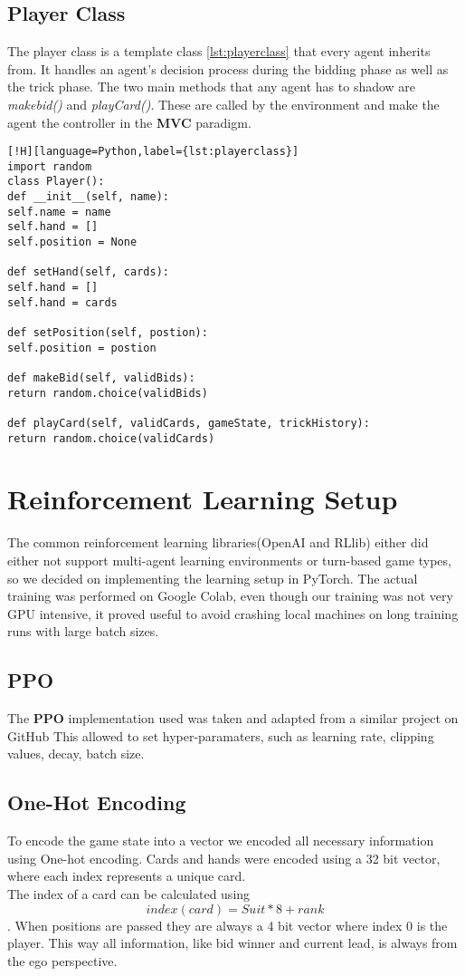 \subsection{Player Class}
The player class is a template class \ref{lst:playerclass} that every agent inherits from.
It handles an agent's decision process during the bidding phase as well as the trick phase.
The two main methods that any agent has to shadow are \textit{makebid()} and \textit{playCard()}.
These are called by the environment and make the agent the controller in the \textbf{MVC} paradigm.
\newline
\begin{lstlisting}[!H][language=Python,label={lst:playerclass}]
import random
class Player():
def __init__(self, name):
self.name = name
self.hand = []
self.position = None

def setHand(self, cards):
self.hand = []
self.hand = cards

def setPosition(self, postion):
self.position = postion

def makeBid(self, validBids):
return random.choice(validBids)

def playCard(self, validCards, gameState, trickHistory):
return random.choice(validCards)
\end{lstlisting}
\section{Reinforcement Learning Setup}
The common reinforcement learning libraries(OpenAI and RLlib) either did either not support multi-agent learning
environments or turn-based game types, so we decided on implementing the learning setup in PyTorch.
The actual training was performed on Google Colab, even though our training was not very GPU intensive, it proved
useful to avoid crashing local machines on long training runs with large batch sizes.
\subsection{PPO}
The \textbf{PPO} implementation used was taken and adapted from a similar project on GitHub \cite{emerich}
This allowed to set hyper-paramaters, such as learning rate, clipping values, decay, batch size.
\subsection{One-Hot Encoding}
To encode the game state into a vector we encoded all necessary information using One-hot encoding.
Cards and hands were encoded using a 32 bit vector, where each index represents a unique card.\\
The index of a card can be calculated using \[index(card) = Suit * 8 + rank\].
When positions are passed they are always a 4 bit vector where index 0 is the player.
This way all information, like bid winner and current lead, is always from the ego perspective.
